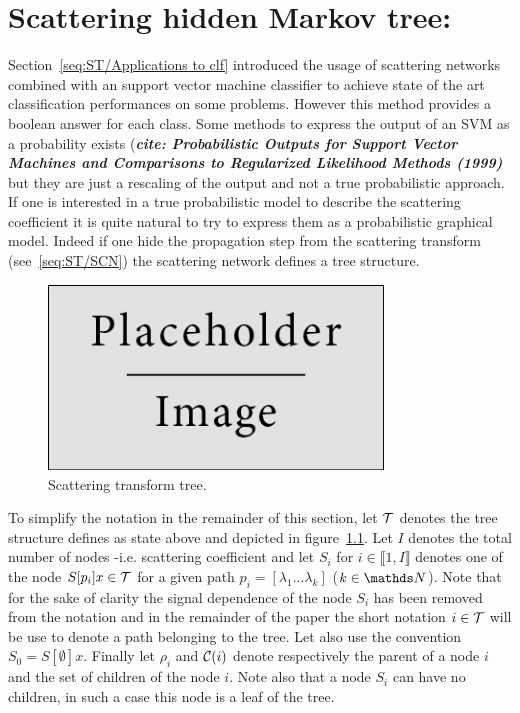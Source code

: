 \documentclass[a4paper,11pt]{report}
\begin{document}
{\chapter{Scattering hidden Markov tree:}
  \label{chap:SHMT}
  Section~\ref{seq:ST/Applications to clf} introduced the usage of scattering networks combined with an support vector machine classifier to achieve state of the art classification performances on some problems. However this method provides a boolean answer for each class. Some methods to express the output of an SVM as a probability exists (\textbf{\textit{cite: Probabilistic Outputs for Support Vector Machines and Comparisons to Regularized Likelihood Methods (1999)}} but they are just a rescaling of the output and not a true probabilistic approach. If one is interested in a true probabilistic model to describe the scattering coefficient it is quite natural to try to express them as a probabilistic graphical model. Indeed if one hide the propagation step from the scattering transform (see~\ref{seq:ST/SCN}) the scattering network defines a tree structure. \\

	\begin{figure}
			\begin{center}
				\includegraphics[width=3.5in]{placeholder.jpg}
				\caption{Scattering transform tree.} %
				\label{fig:ST tree}
			\end{center}
	\end{figure}
  
  To simplify the notation in the remainder of this section, let $\mathcal{T}$ denotes the tree  structure defines as state above and depicted in figure~\ref{fig:ST tree}. Let $I$ denotes the total number of nodes -i.e. scattering coefficient and let $S_{i}$ for $i \in \llbracket1, I \rrbracket$ denotes one of the node $S[p_{i}]x \in \mathcal{T}$ for a given path $p_{i} = [\lambda_{1} ... \lambda_{k}]$ ($k \in \dsN$). Note that for the sake of clarity the signal dependence of the node $S_{i}$ has been removed from the notation and in the remainder of the paper the short notation $i \in \mathcal{T}$ will be use to denote a path belonging to the tree. Let also use the convention $S_{0} = S[\emptyset]x$. Finally let $\rho_{i}$ and $\mathcal{C}(i)$ denote respectively the parent of a node $i$ and the set of children of the node $i$. Note also that a node $S_{i}$ can have no children, in such a case this node is a leaf of the tree.\\
  
}
\end{document}
